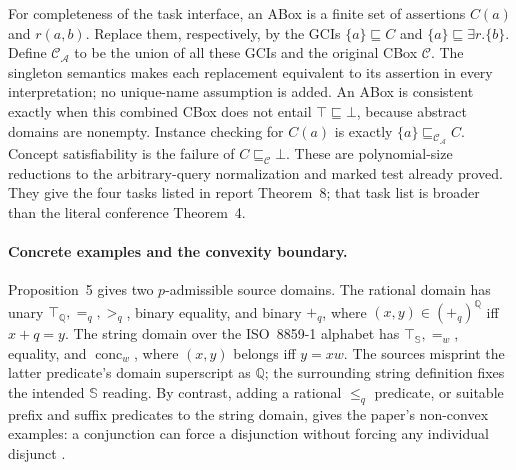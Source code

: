For completeness of the task interface, an ABox is a finite set of
assertions \(C(a)\) and \(r(a,b)\).  Replace them, respectively, by the
GCIs \(\{a\}\sqsubseteq C\) and
\(\{a\}\sqsubseteq\exists r.\{b\}\).  Define
\(\mathcal C_{\mathcal A}\) to be the union of all these GCIs and the
original CBox \(\mathcal C\).
The singleton semantics makes each replacement equivalent to its assertion
in every interpretation; no unique-name assumption is added.
An ABox is consistent exactly when this combined CBox does not entail
\(\top\sqsubseteq\bot\), because abstract domains are nonempty.
Instance checking for \(C(a)\) is exactly
\(\{a\}\sqsubseteq_{\mathcal C_{\mathcal A}}C\).
Concept satisfiability is the failure of
\(C\sqsubseteq_{\mathcal C}\bot\).
These are polynomial-size reductions to the arbitrary-query normalization and
marked test already proved.  They give the four tasks listed in report
Theorem~8; that task list is broader than the literal conference Theorem~4.

\paragraph{Concrete examples and the convexity boundary.}
Proposition~5 gives two \(p\)-admissible source domains.  The rational domain
has unary \(\top_{\mathbb Q},=_{q},>_{q}\), binary equality, and binary
\(+_{q}\), where \((x,y)\in(+_q)^{\mathbb Q}\) iff \(x+q=y\).  The string
domain over the ISO~8859-1 alphabet has \(\top_{\mathbb S},=_{w}\), equality,
and \(\operatorname{conc}_{w}\), where \((x,y)\) belongs iff \(y=xw\).
The sources misprint the latter predicate's domain superscript as
\(\mathbb Q\); the surrounding string definition fixes the intended
\(\mathbb S\) reading.  By contrast, adding a rational \(\leq_q\) predicate,
or suitable prefix and suffix predicates to the string domain, gives the
paper's non-convex examples: a conjunction can force a disjunction without
forcing any individual disjunct
\cite[prop.~5]{BaaderBrandtLutz2005}
\cite[props.~10--11]{BaaderBrandtLutz2005TR}.


